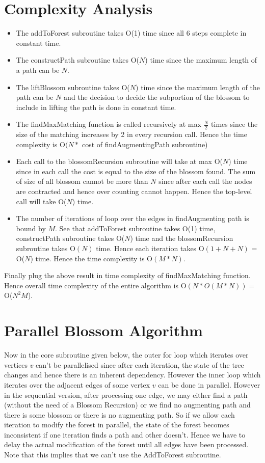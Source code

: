 \documentclass{article}
\begin{document}
\section{Complexity Analysis}
\begin{itemize}
    \item The addToForest subroutine takes O(1) time since all 6 steps complete in constant time.
    \item The constructPath subroutine takes O($N$) time since the maximum length of a path can be $N$.
    \item The liftBlossom subroutine takes O($N$) time since the maximum length of the path can be $N$ and the decision to decide the subportion of the blossom to include in lifting the path is done in constant time.
    \item The findMaxMatching function is called recursively at max $\frac{N}{2}$ times since the size of the matching increases by 2 in every recursion call. Hence the time complexity is O$(N*$ cost of findAugmentingPath subroutine)
    \item Each call to the blossomRecursion subroutine will take at max O($N$) time since in each call the cost is equal to the size of the blossom found. The sum of size of all blossom cannot be more than $N$ since after each call the nodes are contracted and hence over counting cannot happen. Hence the top-level call will take O($N$) time.
    \item The number of iterations of loop over the edges in findAugmenting path is bound by $M$. See that addToForest subroutine takes O(1) time, constructPath subroutine takes O($N$) time and the blossomRecursion subroutine takes O$(N)$ time. Hence each iteration takes O$(1+N+N)$ = O($N$) time. Hence the time complexity is O$(M*N)$.
\end{itemize}

Finally plug the above result in time complexity of findMaxMatching function. Hence overall time complexity of the entire algorithm is O$(N * O(M*N)) = $ O($N^2M$).

\section{Parallel Blossom Algorithm}
Now in the core subroutine given below, the outer for loop which iterates over vertices $v$ can't be parallelised since after each iteration, the state of the tree changes and hence there is an inherent dependency. However the inner loop which iterates over the adjacent edges of some vertex $v$ can be done in parallel. However in the sequential version, after processing one edge, we may either find a path (without the need of a Blossom Recursion) or we find no augmenting path and there is some blossom or there is no augmenting path. So if we allow each iteration to modify the forest in parallel, the state of the forest becomes inconsistent if one iteration finds a path and other doesn't. Hence we have to delay the actual modification of the forest until all edges have been processed. Note that this implies that we can't use the AddToForest subroutine.
\end{document}
